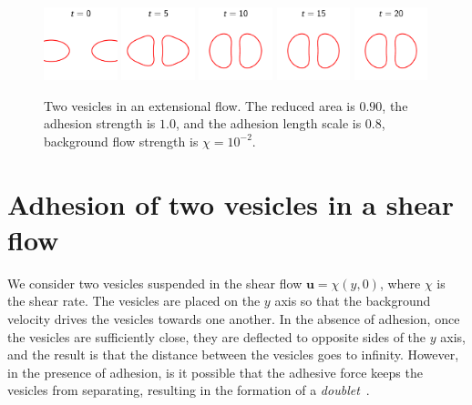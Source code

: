 \documentclass[%
preprint,
 amsmath,amssymb,
 aps,
]{revtex4-1}
\newcommand{\uu}{\mathbf{u}}
\begin{document}
\begin{figure}[htp]
  \includegraphics[width = 0.19\textwidth]{figs/extensional_adR8em1adS1e0_ra090_timestep1.pdf}
  \includegraphics[width = 0.19\textwidth]{figs/extensional_adR8em1adS1e0_ra090_timestep2.pdf}
  \includegraphics[width = 0.19\textwidth]{figs/extensional_adR8em1adS1e0_ra090_timestep3.pdf}
  \includegraphics[width = 0.19\textwidth]{figs/extensional_adR8em1adS1e0_ra090_timestep4.pdf}
  \includegraphics[width = 0.19\textwidth]{figs/extensional_adR8em1adS1e0_ra090_timestep5.pdf}
  \caption{Two vesicles in an extensional flow.  The reduced area is
  $0.90$, the adhesion strength is $1.0$, and the adhesion length scale
is $0.8$, background flow strength is $\chi = 10^{-2}$.}
\end{figure}



\section{Adhesion of two vesicles in a shear flow}
\label{sec:sflow} 
We consider two vesicles suspended in the shear flow $\uu = \chi(y,0)$,
where $\chi$ is the shear rate.  The vesicles are placed on the $y$ axis
so that the background velocity drives the vesicles towards one another.
In the absence of adhesion, once the vesicles are sufficiently close,
they are deflected to opposite sides of the $y$ axis, and the result is
that the distance between the vesicles goes to infinity.  However, in
the presence of adhesion, is it possible that the adhesive force keeps
the vesicles from separating, resulting in the formation of a {\em
doublet}~\cite{}.
\end{document}
